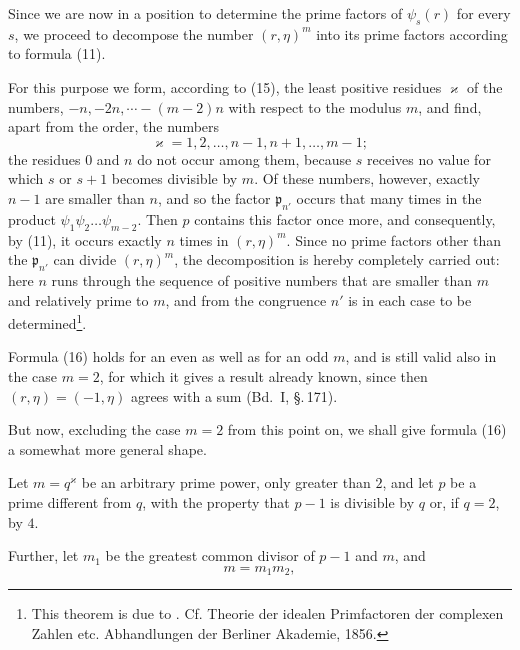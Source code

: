 Since we are now in a position to determine the prime factors of $\psi_s(r)$ for every $s$, we proceed to decompose the number $(r,\eta)^m$ into its prime factors according to formula (11).

For this purpose we form, according to (15), the least positive residues $\varkappa$ of the numbers, $-n, -2n, \cdots -(m-2)n$ with respect to the modulus $m$, and find, apart from the order, the numbers
\[
\varkappa = 1, 2, \ldots, n-1, n+1, \ldots, m-1;
\]
the residues $0$ and $n$ do not occur among them, because $s$ receives no value for which $s$ or $s+1$ becomes divisible by $m$. Of these numbers, however, exactly $n-1$ are smaller than $n$, and so the factor $\mathfrak{p}_{n'}$ occurs that many times in the product $\psi_1\psi_2\ldots\psi_{m-2}$. Then $p$ contains this factor once more, and consequently, by (11), it occurs exactly $n$ times in $(r,\eta)^m$. Since no prime factors other than the $\mathfrak{p}_{n'}$ can divide $(r,\eta)^m$, the decomposition is hereby completely carried out:
here $n$ runs through the sequence of positive numbers that are smaller than $m$ and relatively prime to $m$, and from the congruence
$n'$ is in each case to be determined\footnote{This theorem is due to . Cf. Theorie der idealen Primfactoren der complexen Zahlen etc. Abhandlungen der Berliner Akademie, 1856.}.

Formula (16) holds for an even as well as for an odd $m$, and is still valid also in the case $m=2$, for which it gives a result already known, since then $(r,\eta) = (-1,\eta)$ agrees with a  sum (Bd.\ I, \S.\,171).

But now, excluding the case $m=2$ from this point on, we shall give formula (16) a somewhat more general shape.

Let $m=q^{\varkappa}$ be an arbitrary prime power, only greater than $2$, and let $p$ be a prime different from $q$, with the property that $p-1$ is divisible by $q$ or, if $q=2$, by $4$.

Further, let $m_1$ be the greatest common divisor of $p-1$ and $m$, and
\[
m = m_1 m_2,
\]
